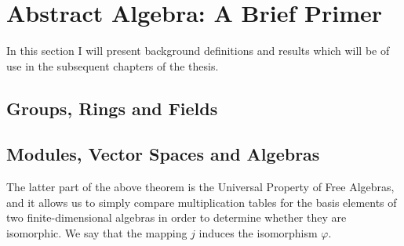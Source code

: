 \section{Abstract Algebra: A Brief Primer}
In this section I will present background definitions and results which will be of use in the subsequent chapters of the thesis.

\subsection{Groups, Rings and Fields}






\subsection{Modules, Vector Spaces and Algebras}












	
The latter part of the above theorem is the Universal Property of Free Algebras, and it allows us to simply compare multiplication tables for the basis elements of two finite-dimensional algebras in order to determine whether they are isomorphic. We say that the mapping $j$ induces the isomorphism $\varphi$.

%





